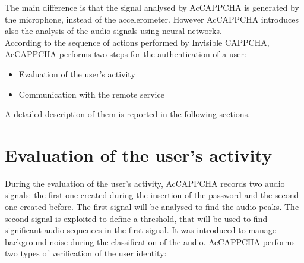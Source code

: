 The main difference is that the signal analysed by AcCAPPCHA is generated by the microphone, instead of the accelerometer. However AcCAPPCHA introduces also the analysis of the audio signals using neural networks.\\
According to the sequence of actions performed by Invisible CAPPCHA, AcCAPPCHA performs two steps for the authentication of a user:
\begin{itemize}
\item{Evaluation of the user's activity}
\item{Communication with the remote service}
\end{itemize}
A detailed description of them is reported in the following sections.

\section{Evaluation of the user's activity}\label{AcCAPPCHA:user_activity}
During the evaluation of the user's activity, AcCAPPCHA records two audio signals: the first one created during the insertion of the password and the second one created before. The first signal will be analysed to find the audio peaks. The second signal is exploited to define a threshold, that will be used to find significant audio sequences in the first signal. It was introduced to manage background noise during the classification of the audio. AcCAPPCHA performs two types of verification of the user identity:
